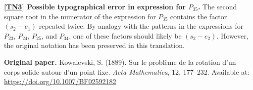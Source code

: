 \documentclass{article}
\begin{document}
\noindent\hypertarget{TN3}{}\textbf{\hyperlink{TN3-ref}{[TN3]} Possible typographical error in expression for $P_{35}$.} The second square root in the numerator of the expression for $P_{35}$ contains the factor $(s_2 - e_1)$ repeated twice. By analogy with the patterns in the expressions for $P_{23}$, $P_{24}$, $P_{25}$, and $P_{34}$, one of these factors should likely be $(s_2 - e_2)$. However, the original notation has been preserved in this translation.

\vspace{1em}
\noindent\textbf{Original paper.} Kowalevski, S. (1889). Sur le problème de la rotation d'un corps solide autour d'un point fixe. \textit{Acta Mathematica}, 12, 177--232. Available at: \url{https://doi.org/10.1007/BF02592182}

\vspace{1em}

\end{document}
